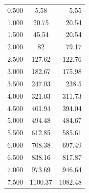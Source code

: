 \documentclass[a4paper,11pt]{report}
\begin{document}
\begin{figure}
\begin{center}
\begin{tabular}{|l|c|r|}
0.500 & 5.58 & 5.55\\
1.000  &20.75& 20.54\\
1.500  &45.54& 20.54\\
2.000  &82  & 79.17\\
2.500  &127.62& 122.76\\
3.000  &182.67& 175.98\\
3.500  &247.03& 238.5\\
4.000  &321.03&311.73\\
4.500  &401.94&394.04\\
5.000  &494.48&484.67\\
5.500  &612.85&585.61\\
6.000  &708.38&697.49\\
6.500  &838.16&817.87\\
7.000  &973.69&946.64\\
7.500  &1100.37&1082.48\\
\hline
\end{tabular}
\newline
  \end{center}
\end{figure}
\end{document}
